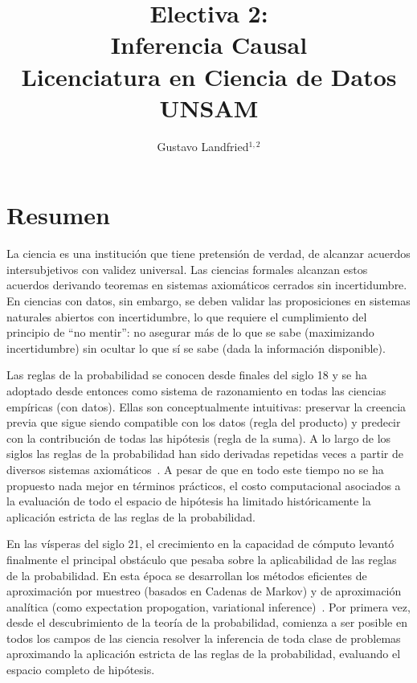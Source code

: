 \documentclass[10pt]{article}
\title{\huge Electiva 2: \\ Inferencia Causal \\[0.4cm]  \LARGE Licenciatura en Ciencia de Datos UNSAM}
\author{Gustavo Landfried$^{1,2}$}
\affil{\footnotesize 1. Departamento de Computación. Facultad de Ciencias Exactas y Naturales. Universidad de Buenos Aires.}
\affil{\vspace{-0.2cm}\footnotesize 2. Bayes Plurinacional}
\affil[]{Correspondencia: \texttt{glandfried@dc.uba.ar}}
\begin{document}
\maketitle

\section{Resumen}

La ciencia es una institución que tiene pretensión de verdad, de alcanzar acuerdos intersubjetivos con validez universal.
Las ciencias formales alcanzan estos acuerdos derivando teoremas en sistemas axiomáticos cerrados sin incertidumbre.
En ciencias con datos, sin embargo, se deben validar las proposiciones en sistemas naturales abiertos con incertidumbre, lo que requiere el cumplimiento del principio de ``no mentir'': no asegurar más de lo que se sabe (maximizando incertidumbre) sin ocultar lo que sí se sabe (dada la información disponible).


Las reglas de la probabilidad se conocen desde finales del siglo 18 y se ha adoptado desde entonces como sistema de razonamiento en todas las ciencias empíricas (con datos).
Ellas son conceptualmente intuitivas: preservar la creencia previa que sigue siendo compatible con los datos (regla del producto) y predecir con la contribución de todas las hipótesis (regla de la suma).
A lo largo de los siglos las reglas de la probabilidad han sido derivadas repetidas veces a partir de diversos sistemas axiomáticos~\cite{halpern2017-RAU2}.
A pesar de que en todo este tiempo no se ha propuesto nada mejor en términos prácticos, el costo computacional asociados a la evaluación de todo el espacio de hipótesis ha limitado históricamente la aplicación estricta de las reglas de la probabilidad.


En las vísperas del siglo 21, el crecimiento en la capacidad de cómputo levantó finalmente el principal obstáculo que pesaba sobre la aplicabilidad de las reglas de la probabilidad.
En esta época se desarrollan los métodos eficientes de aproximación por muestreo (basados en Cadenas de Markov) y de aproximación analítica (como expectation propogation, variational inference)~\cite{bishop2006-PRML}.
Por primera vez, desde el descubrimiento de la teoría de la probabilidad, comienza a ser posible en todos los campos de las ciencia resolver la inferencia de toda clase de problemas aproximando la aplicación estricta de las reglas de la probabilidad, evaluando el espacio completo de hipótesis.
\end{document}
